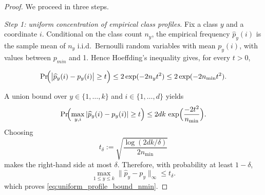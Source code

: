 \documentclass[preprint,11pt]{elsarticle}
\newtheorem{Remark}[Theorem]{Remark}
\begin{document}
\begin{proof}
We proceed in three steps.

\medskip
\noindent\emph{Step 1: uniform concentration of empirical class profiles.}
Fix a class $y$ and a coordinate $i$. Conditional on the class count $n_y$, the empirical frequency $\widehat p_y(i)$ is the sample mean of $n_y$
i.i.d.\ Bernoulli random variables with mean $p_y(i)$, with values between $p_{min}$ and 1. Hence Hoeffding's inequality \cite{Hoeffding1963,BoucheronLugosiMassart2013} gives, for every $t>0$,

    
    
    
    
    
    
    
    
    
    






\[
\Pr\!\Bigl(\bigl|\widehat p_y(i)-p_y(i)\bigr|\ge t \Bigr)
\le
2\exp(-2n_y t^2)
\le
2\exp(-2n_{\min} t^2).
\]

A union bound over $y\in\{1,\dots,k\}$ and $i\in\{1,\dots,d\}$ yields
\[
\Pr\!\Bigl(\max_{y,i} |\widehat p_y(i)-p_y(i)|\ge t\Bigr)
\le
2dk\,\exp\Bigl(\frac{-2t^2}{n_{\min}}\Bigr).
\]
Choosing
\[
t_\delta:=\sqrt{\frac{\log(2dk/\delta)}{2n_{\min}}}
\]
makes the right-hand side at most $\delta$. Therefore, with probability at least $1-\delta$,
\[
\max_{1\le y\le k}\|\widehat p_y-p_y\|_\infty \le t_\delta.
\]
which proves  \eqref{eq:uniform_profile_bound_nmin}.


\end{proof}
\end{document}
